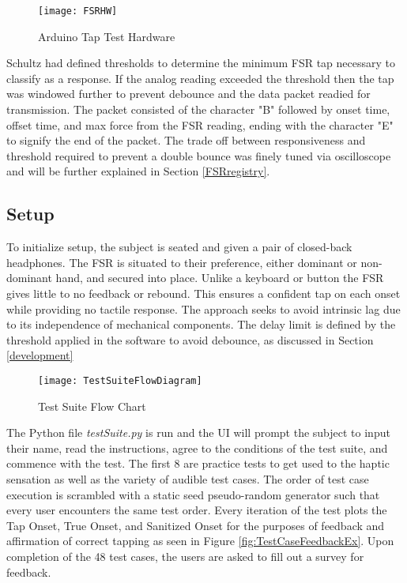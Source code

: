 \begin{figure}[H]
    \centering
    \texttt{[image: FSRHW]}
    \caption{Arduino Tap Test Hardware}
\end{figure}

Schultz had defined thresholds to determine the minimum FSR tap necessary to classify as a response. If the analog reading exceeded the threshold then the tap was windowed further to prevent debounce and the data packet readied for transmission. The packet consisted of the character "B" followed by onset time, offset time, and max force from the FSR reading, ending with the character "E" to signify the end of the packet. The trade off between responsiveness and threshold required to prevent a double bounce was finely tuned via oscilloscope and will be further explained in Section \ref{FSRregistry}.

\subsection{Setup} \label{testSetup}
To initialize setup, the subject is seated and given a pair of closed-back headphones. The FSR is situated to their preference, either dominant or non-dominant hand, and secured into place. Unlike a keyboard or button the FSR gives little to no feedback or rebound. This ensures a confident tap on each onset while providing no tactile response. The approach seeks to avoid intrinsic lag due to its independence of mechanical components. The delay limit is defined by the threshold applied in the software to avoid debounce, as discussed in Section \ref{development}

\begin{figure}[H]
    \centering
    \texttt{[image: TestSuiteFlowDiagram]}
    \caption{Test Suite Flow Chart}
    \label{fig:TestSuiteFlowDiagram}
\end{figure}

The Python file \textit{testSuite.py} is run and the UI will prompt the subject to input their name, read the instructions, agree to the conditions of the test suite, and commence with the test. The first 8 are practice tests to get used to the haptic sensation as well as the variety of audible test cases. The order of test case execution is scrambled with a static seed pseudo-random generator such that every user encounters the same test order. Every iteration of the test plots the Tap Onset, True Onset, and Sanitized Onset  for the purposes of feedback and affirmation of correct tapping as seen in Figure \ref{fig:TestCaseFeedbackEx}. Upon completion of the 48 test cases, the users are asked to fill out a survey for feedback.

